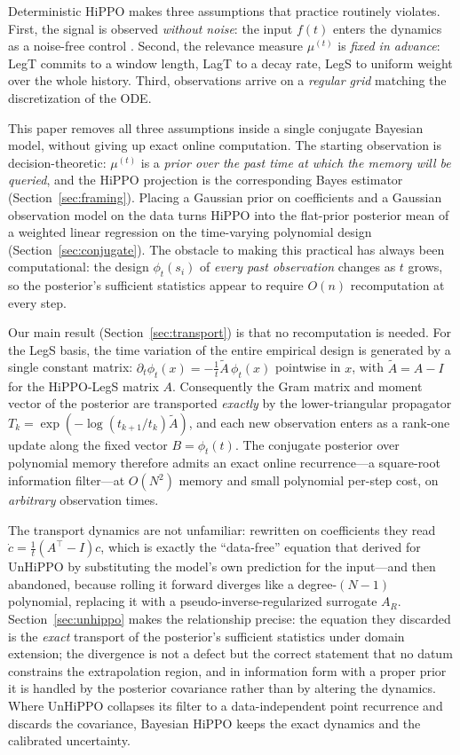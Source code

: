 \documentclass[11pt]{article}
\newcommand{\mut}{\mu^{(t)}}
\newcommand{\At}{\widetilde{A}}
\begin{document}
Deterministic HiPPO makes three assumptions that practice routinely violates. First, the signal is observed \emph{without noise}: the input $f(t)$ enters the dynamics as a noise-free control \citep{lienen2025unhippo}. Second, the relevance measure $\mut$ is \emph{fixed in advance}: LegT commits to a window length, LagT to a decay rate, LegS to uniform weight over the whole history. Third, observations arrive on a \emph{regular grid} matching the discretization of the ODE.

This paper removes all three assumptions inside a single conjugate Bayesian model, without giving up exact online computation. The starting observation is decision-theoretic: $\mut$ is a \emph{prior over the past time at which the memory will be queried}, and the HiPPO projection is the corresponding Bayes estimator (Section~\ref{sec:framing}). Placing a Gaussian prior on coefficients and a Gaussian observation model on the data turns HiPPO into the flat-prior posterior mean of a weighted linear regression on the time-varying polynomial design (Section~\ref{sec:conjugate}). The obstacle to making this practical has always been computational: the design $\phi_t(s_i)$ of \emph{every past observation} changes as $t$ grows, so the posterior's sufficient statistics appear to require $O(n)$ recomputation at every step.

Our main result (Section~\ref{sec:transport}) is that no recomputation is needed. For the LegS basis, the time variation of the entire empirical design is generated by a single constant matrix: $\partial_t\phi_t(x)=-\tfrac1t\At\,\phi_t(x)$ pointwise in $x$, with $\At=A-I$ for the HiPPO-LegS matrix $A$. Consequently the Gram matrix and moment vector of the posterior are transported \emph{exactly} by the lower-triangular propagator $T_k=\exp(-\log(t_{k+1}/t_k)\At)$, and each new observation enters as a rank-one update along the fixed vector $B=\phi_t(t)$. The conjugate posterior over polynomial memory therefore admits an exact online recurrence---a square-root information filter---at $O(N^2)$ memory and small polynomial per-step cost, on \emph{arbitrary} observation times.

The transport dynamics are not unfamiliar: rewritten on coefficients they read $\dot c=\tfrac1t(A^\top-I)c$, which is exactly the ``data-free'' equation that \citet{lienen2025unhippo} derived for UnHiPPO by substituting the model's own prediction for the input---and then abandoned, because rolling it forward diverges like a degree-$(N{-}1)$ polynomial, replacing it with a pseudo-inverse-regularized surrogate $A_R$. Section~\ref{sec:unhippo} makes the relationship precise: the equation they discarded is the \emph{exact} transport of the posterior's sufficient statistics under domain extension; the divergence is not a defect but the correct statement that no datum constrains the extrapolation region, and in information form with a proper prior it is handled by the posterior covariance rather than by altering the dynamics. Where UnHiPPO collapses its filter to a data-independent point recurrence and discards the covariance, Bayesian HiPPO keeps the exact dynamics and the calibrated uncertainty.
\end{document}
